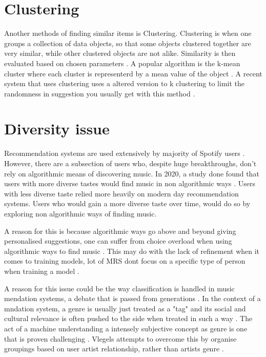 \section{Clustering}

Another methods of finding similar items is Clustering. Clustering is when one  groups a collection of data objects, so that some objects clustered together are very similar, while other clustered objects are not alike. Similarity is then evaluated based on chosen parameters \citep{ferretti_clustering_2018}. A popular algorithm is the k-mean cluster where each cluster is representerd by a mean value of the object \citep{han_data_2006}. A recent system that uses clustering uses a altered version to k clustering to limit the randomness in suggestion you usually get with this method \citep{chang_personalized_2017}.


\section{Diversity issue}

Recommendation systems are used extensively by majority of Spotify users \citep{spotify_spotify_2020}. However, there are a subsection of users who, despite huge breakthroughs, don't rely on algorithmic means of discovering music. In 2020, a study done found that users with more diverse tastes would find music in non algorithmic ways \citep{anderson_algorithmic_2020}. Users with less diverse taste relied more heavily on modern day recommendation systems. Users who would gain a more diverse taste over time, would do so by exploring non algorithmic ways of finding music.

A reason for this is because algorithmic ways go above and beyond giving personalised suggestions, one can suffer from choice overload when using algorithmic ways to find music \citep{iyengar_rethinking_1999}. This may do with the lack of refinement when it comes to training models, lot of MRS dont focus on a specific type of person when training a model \citep{laplante_improving_2014}.

A reason for this issue could be the way classification is handled in music mendation systems, a debate that is passed from generations \citep{moles_sociodynamique_2019} \citep{dimaggio_classification_1987} \citep{bourdieu_distinction_2010}. In the context of a mndation system, a genre is usually just treated as a "tag" and its social and cultural relevance is often pushed to the side when treated in such a way \citep{porcaro_diversity_2021}. The act of a machine understanding a intensely subjective concept as genre is one that is proven challenging \citep{nurnberger_survey_2014}. Vlegels attempts to overcome this by organise groupings based on user artist relationship, rather than artists genre \citep{vlegels_music_2017}.

